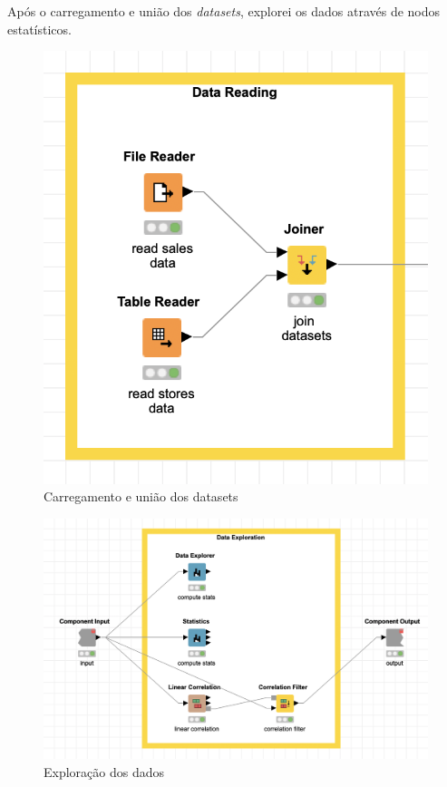 Após o carregamento e união dos \textit{datasets}, explorei os dados através de nodos estatísticos.

\begin{figure}[H]
    \centering
    \includegraphics[scale=0.5]{Images/T1_a.png}
    \caption{Carregamento e união dos datasets}
\end{figure}

\begin{figure}[H]
    \centering
    \includegraphics[scale=0.4]{Images/T1_b.png}
    \caption{Exploração dos dados}
\end{figure}

